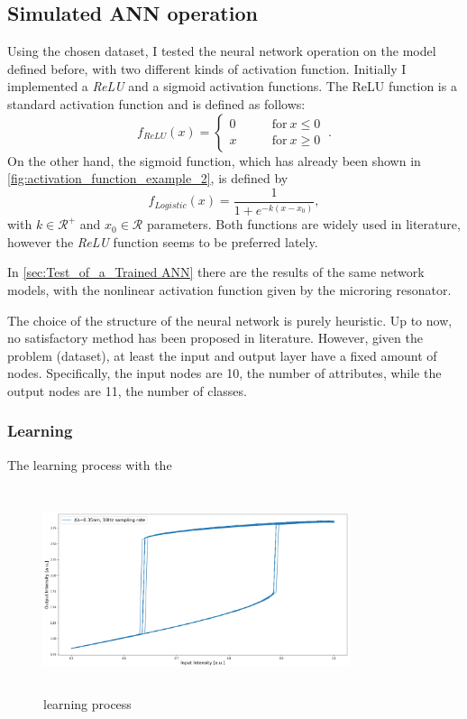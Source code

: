 \subsection{Simulated ANN operation}
\label{ssec:Simulated_ANN_operation}
Using the chosen dataset, I tested the neural network operation on the model defined before, with two different kinds of activation function.
Initially I implemented a \textit{ReLU} and a sigmoid activation functions.
The ReLU function is a standard activation function and is defined as follows:
\begin{equation}
f_{ReLU}(x) =
\begin{cases}
	0 & \qquad \mathrm{for}~ x\leq 0\\
	x & \qquad \mathrm{for}~ x\geq 0
\end{cases}~.
\label{eq:relu}
\end{equation}
On the other hand, the sigmoid function, which has already been shown in \autoref{fig:activation_function_example_2}, is defined by
\begin{equation}
f_{Logistic}(x) = \frac{1}{1+e^{-k\left(x-x_0\right)}},
\end{equation}
with $k\in \mathcal{R}^+$ and $x_0\in \mathcal{R}$ parameters.
Both functions are widely used in literature, however the \textit{ReLU} function seems to be preferred lately.

In \autoref{sec:Test_of_a_Trained ANN} there are the results of the same network models, with the nonlinear activation function given by the microring resonator.

The choice of the structure of the neural network is purely heuristic.
Up to now, no satisfactory method has been proposed in literature.
However, given the problem (dataset), at least the input and output layer have a fixed amount of nodes.
Specifically, the input nodes are \num{10}, the number of attributes, while the output nodes are \num{11}, the number of classes.

\subsubsection{Learning}
The learning process with the
\begin{figure}[htbp]
	\centering
	\includegraphics[draft,width=9cm,height=6cm]{figures/foo.png}
	\caption{learning process}
	\label{fig:PyTorch_learning}
\end{figure}

